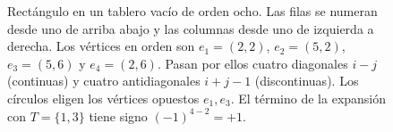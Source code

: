 \begin{figure}[htbp]
\centering
{}
\caption{Rectángulo en un tablero vacío de orden ocho. Las filas se numeran desde uno de arriba abajo
y las columnas desde uno de izquierda a derecha. Los vértices en orden son $e_1=(2,2)$, $e_2=(5,2)$,
$e_3=(5,6)$ y $e_4=(2,6)$. Pasan por ellos cuatro diagonales $i-j$ (continuas) y cuatro antidiagonales
$i+j-1$ (discontinuas). Los círculos eligen los vértices opuestos $e_1,e_3$. El término de la
expansión con $T=\{1,3\}$ tiene signo $(-1)^{4-2}=+1$.}\label{fig:rectangulo}
\end{figure}
